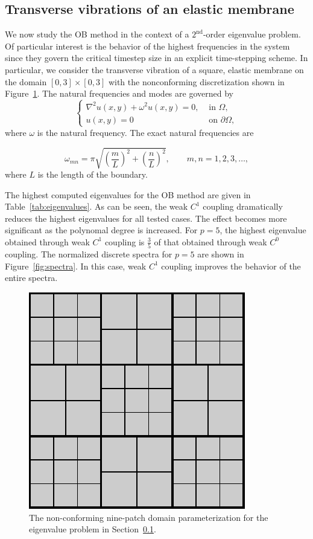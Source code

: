 \subsection{Transverse vibrations of an elastic membrane}\label{sec:eigenvalue}

We now study the OB method in the context of a $2^\text{nd}$-order eigenvalue problem. Of particular interest is the behavior of the highest frequencies in the system since they govern the critical timestep size in an explicit time-stepping scheme. In particular, we consider the transverse vibration of a square, elastic membrane on the domain $\left[{0,3}\right] \times \left[{0,3}\right]$ with the nonconforming discretization shown in Figure~\ref{fig:eigenvalue_mesh}. The natural frequencies and modes are governed by
\begin{equation}
	\left\{\begin{split}
		\nabla^2 u(x,y) +\omega^2 u(x,y) = 0, & \text{ in } \Omega,\\
		u(x, y) = 0 & \text{ on } \partial \Omega,
	\end{split}\right.
\end{equation}
where $\omega$ is the natural frequency. The exact natural frequencies are

\begin{equation}
	\omega_{mn} = \pi \sqrt{\left(\frac{m}{L}\right)^2+\left(\frac{n}{L}\right)^2},\quad\quad m,n = 1,2,3,\dots,
\end{equation}
where $L$ is the length of the boundary.\par

The highest computed eigenvalues for the OB method are given in Table~\ref{tab:eigenvalues}. As can be seen, the weak $C^1$ coupling dramatically reduces the highest eigenvalues for all tested cases. The effect becomes more significant as the polynomal degree is increased. For $p=5$, the highest eigenvalue obtained through weak $C^1$ coupling is $\frac{3}{5}$ of that obtained through weak $C^0$ coupling. The normalized discrete spectra for $p=5$ are shown in Figure~\ref{fig:spectra}. In this case, weak $C^1$ coupling improves the behavior of the entire spectra.

\begin{figure}[ht]
	\centering
	\includegraphics[width=.3\textwidth]{eigenvalue_mesh}
	\caption{The non-conforming nine-patch domain parameterization for the eigenvalue problem in Section~\ref{sec:eigenvalue}.}\label{fig:eigenvalue_mesh}
\end{figure}


